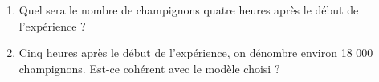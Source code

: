 \documentclass[10pt]{article}
\begin{document}
\begin{center}
\begin{minipage}{0.75\textwidth}
\begin{enumerate}[start=3]
\item Quel sera le nombre de champignons quatre heures après le début de l'expérience ?

\item Cinq heures après le début de l'expérience, on dénombre environ 18 000 champignons. Est-ce cohérent avec le modèle choisi ?
\end{enumerate}
\end{minipage}
\hfill
{}
\end{center}
\end{document}
